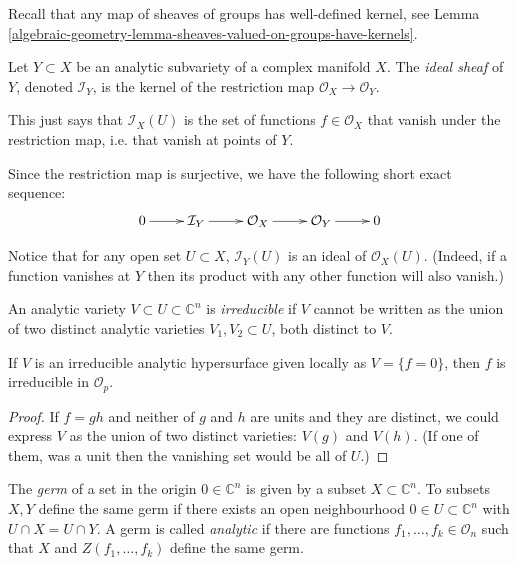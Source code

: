 Recall that any map of sheaves of groups
has well-defined kernel, see Lemma
\ref{algebraic-geometry-lemma-sheaves-valued-on-groups-have-kernels}.

\begin{definition}
\label{definition-ideal-sheaf}
Let $Y \subset X$ be an analytic subvariety
of a complex manifold $X$.
The {\it ideal sheaf} of $Y$, denoted $\mathcal{I}_Y$,
is the kernel
of the restriction map $\mathcal{O}_X \to \mathcal{O}_Y$.
\end{definition}

\noindent
This just says that $\mathcal{I}_X(U)$ is the
set of functions $f \in \mathcal{O}_X$ that
vanish under the restriction map, i.e.
that vanish at points of $Y$.

Since the restriction map is surjective, 
we have the following short exact sequence:
$$
\xymatrix{
0\ar[r]&\mathcal{I}_Y\ar[r]&\mathcal{O}_X\ar[r]&\mathcal{O}_Y\ar[r]&0
}
$$

\medskip\noindent
Notice that for any open set $U\subset X$,
$\mathcal{I}_Y(U)$ is an ideal of $\mathcal{O}_X(U)$. (Indeed,
if a function vanishes at $Y$ then its product
with any other function will also vanish.)

\begin{definition}
\label{definition-irreducible-variety}
An analytic variety $V\subset U\subset \mathbb{C}^n$ is {\it irreducible} if
$V$ cannot be written as the union of two distinct analytic varieties 
$V_1,V_2\subset U$, both distinct to $V$.
\end{definition}

\begin{lemma}
\label{lemma-irreducible-analytic-hypersurface-irreducible-polynomial}
If $V$ is an irreducible analytic hypersurface given locally as $V=\{f=0\}$, 
then $f$ is irreducible in $\mathcal{O}_p$.
\end{lemma}

\begin{proof}
If $f=gh$ and neither of $g$ and $h$ are units and they are distinct, we could 
express $V$ as the union of two distinct varieties: $V(g)$ and $V(h)$. (If one 
of them, was a unit then the vanishing set would be all of $U$.)
\end{proof}

\begin{definition}
\label{definition-germ-of-set}
\begin{reference}
\cite[Definition 1.1.21]{huc}
\end{reference}
The {\it germ} of a set in the origin $0\in \mathbb{C}^n$ is given by a subset
$X \subset \mathbb{C}^n$. To subsets $X,Y$ define the same germ if there exists
an open neighbourhood $0 \in U\subset \mathbb{C}^n$ with $U\cap X=U\cap Y$. A
germ is called {\it analytic} if there are functions $f_1,\ldots,f_k\in
\mathcal{O}_n$ such that $X$ and $Z(f_1,\ldots,f_k)$ define the same germ.
\end{definition}




